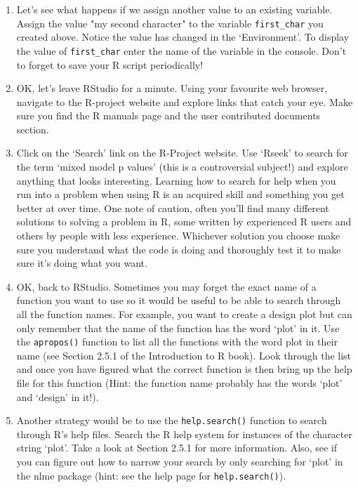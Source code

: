 \documentclass[12pt]{article}
\begin{document}
\begin{enumerate}
 

\item Let’s see what happens if we assign another value to an existing variable. Assign the value "my second character" to the variable \lstinline{first_char} you created above. Notice the value has changed in the ‘Environment’. To display the value of \lstinline{first_char} enter the name of the variable in the console. Don’t to forget to save your R script periodically!

 

\item OK, let’s leave RStudio for a minute. Using your favourite web browser, navigate to the R-project website and explore links that catch your eye. Make sure you find the R manuals page and the user contributed documents section.
 

\item Click on the ‘Search’ link on the R-Project website. Use ‘Rseek’ to search for the term ‘mixed model p values’ (this is a controversial subject!) and explore anything that looks interesting. Learning how to search for help when you run into a problem when using R is an acquired skill and something you get better at over time. One note of caution, often you’ll find many different solutions to solving a problem in R, some written by experienced R users and others by people with less experience. Whichever solution you choose make sure you understand what the code is doing and thoroughly test it to make sure it’s doing what you want.

 

\item OK, back to RStudio. Sometimes you may forget the exact name of a function you want to use so it would be useful to be able to search through all the function names. For example, you want to create a design plot but can only remember that the name of the function has the word ‘plot’ in it. Use the \lstinline{apropos()} function to list all the functions with the word plot in their name (see Section 2.5.1 of the Introduction to R book). Look through the list and once you have figured what the correct function is then bring up the help file for this function (Hint: the function name probably has the words ‘plot’ and ‘design’ in it!).

 

\item Another strategy would be to use the \lstinline{help.search()} function to search through R’s help files. Search the R help system for instances of the character string ‘plot’. Take a look at Section 2.5.1 for more information. Also, see if you can figure out how to narrow your search by only searching for ‘plot’ in the nlme package (hint: see the help page for \lstinline{help.search()}).


\end{enumerate}
\end{document}
